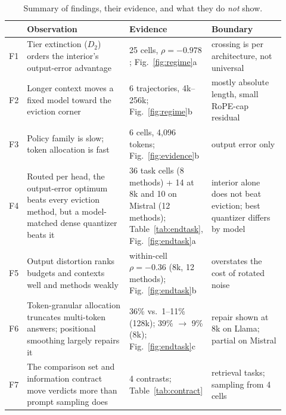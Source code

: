 \documentclass{article}
\theoremstyle{definition}
\begin{document}
\begin{table}[t]
\centering
\small
\setlength{\tabcolsep}{4pt}
\caption{Summary of findings, their evidence, and what they do \emph{not} show.}
\label{tab:findings}
\begin{tabular}{@{}p{0.03\linewidth}p{0.40\linewidth}p{0.20\linewidth}p{0.29\linewidth}@{}}
\toprule
& \textbf{Observation} & \textbf{Evidence} & \textbf{Boundary} \\
\midrule
F1 & Tier extinction ($D_2$) orders the interior's output-error advantage & 25 cells, $\rho=-0.978$; Fig.~\ref{fig:regime}a & crossing is per architecture, not universal \\
F2 & Longer context moves a fixed model toward the eviction corner & 6 trajectories, 4k--256k; Fig.~\ref{fig:regime}b & mostly absolute length, small RoPE-cap residual \\
F3 & Policy family is slow; token allocation is fast & 6 cells, 4,096 tokens; Fig.~\ref{fig:evidence}b & output error only \\
F4 & Routed per head, the output-error optimum beats every eviction method, but a model-matched dense quantizer beats it & 36 task cells (8 methods) + 14 at 8k and 10 on Mistral (12 methods); Table~\ref{tab:endtask}, Fig.~\ref{fig:endtask}a & interior alone does not beat eviction; best quantizer differs by model \\ %
F5 & Output distortion ranks budgets and contexts well and methods weakly & within-cell $\rho=-0.36$ (8k, 12 methods); Fig.~\ref{fig:endtask}b & overstates the cost of rotated noise \\ %
F6 & Token-granular allocation truncates multi-token answers; positional smoothing largely repairs it & 36\% vs.\ 1--11\% (128k); 39\% $\to$ 9\% (8k); Fig.~\ref{fig:endtask}c & repair shown at 8k on Llama; partial on Mistral \\ %
F7 & The comparison set and information contract move verdicts more than prompt sampling does & 4 contrasts; Table~\ref{tab:contract} & retrieval tasks; sampling from 4 cells \\ %
\bottomrule
\end{tabular}
\vspace{-2mm}
\end{table}
\end{document}
